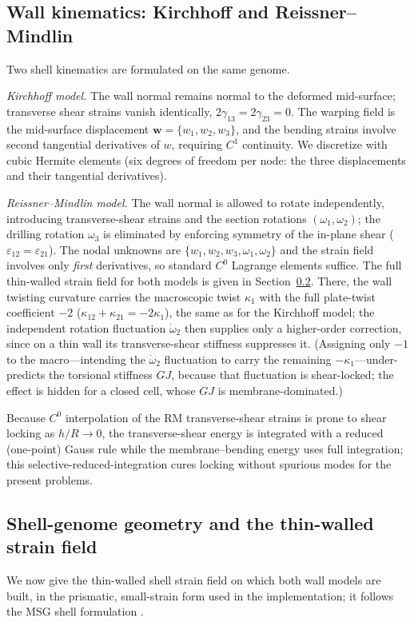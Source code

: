 \documentclass[preprint,12pt]{elsarticle}
\newcommand{\eps}{\varepsilon}
\newcommand{\hR}{h/R}
\begin{document}
\subsection{Wall kinematics: Kirchhoff and Reissner--Mindlin}
Two shell kinematics are formulated on the same genome.

\emph{Kirchhoff model.} The wall normal remains normal to the deformed
mid-surface; transverse shear strains vanish identically,
$2\gamma_{13}=2\gamma_{23}=0$. The warping field is the mid-surface
displacement $\bm{w}=\{w_1,w_2,w_3\}$, and the bending strains involve second
tangential derivatives of $w$, requiring $C^{1}$ continuity. We discretize with
cubic Hermite elements (six degrees of freedom per node: the three
displacements and their tangential derivatives).

\emph{Reissner--Mindlin model.} The wall normal is allowed to rotate
independently, introducing transverse-shear strains and the section rotations
$(\omega_1,\omega_2)$; the drilling rotation $\omega_3$ is eliminated by
enforcing symmetry of the in-plane shear ($\eps_{12}=\eps_{21}$). The nodal
unknowns are $\{w_1,w_2,w_3,\omega_1,\omega_2\}$ and the strain field involves
only \emph{first} derivatives, so standard $C^{0}$ Lagrange elements suffice.
The full thin-walled strain field for both models is given in
Section~\ref{sec:strainfield}. There, the wall twisting curvature carries the
macroscopic twist $\kappa_1$ with the full plate-twist coefficient $-2$
($\kappa_{12}{+}\kappa_{21}=-2\kappa_1$), the same as for the Kirchhoff model;
the independent rotation fluctuation $\dot\omega_2$ then supplies only a
higher-order correction, since on a thin wall its transverse-shear stiffness
suppresses it. (Assigning only $-1$ to the macro---intending the $\dot\omega_2$
fluctuation to carry the remaining $-\kappa_1$---under-predicts the torsional
stiffness $GJ$, because that fluctuation is shear-locked; the effect is hidden
for a closed cell, whose $GJ$ is membrane-dominated.)

Because $C^{0}$ interpolation of the RM transverse-shear strains is prone to
shear locking as $\hR\to0$, the transverse-shear energy is integrated with a
reduced (one-point) Gauss rule while the membrane--bending energy uses full
integration; this selective-reduced-integration cures locking without spurious
modes for the present problems.

\subsection{Shell-genome geometry and the thin-walled strain field}
\label{sec:strainfield}
We now give the thin-walled shell strain field on which both wall models are
built, in the prismatic, small-strain form used in the implementation; it
follows the MSG shell formulation \cite{yu2016msg,liu2017msg}.
\end{document}

